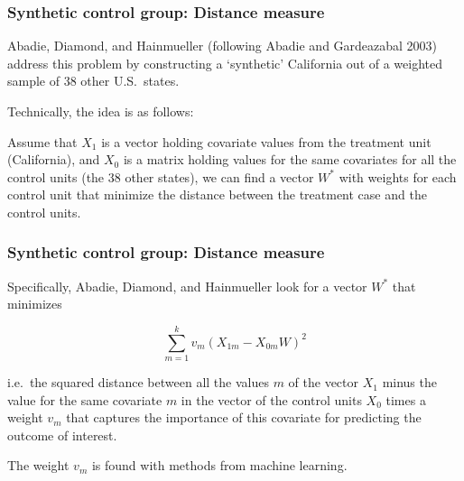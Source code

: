 \documentclass[12pt,english,dvipsnames,aspectratio=169,handout]{beamer}\usepackage[]{graphicx}\usepackage[]{xcolor}
\begin{document}
\begin{frame}
  \frametitle{Synthetic control group: Distance measure}
\footnotesize

Abadie, Diamond, and Hainmueller \citeyear{abadie_synthetic_2010} (following Abadie and Gardeazabal 2003) address this problem by constructing a `synthetic' California out of a weighted sample of 38 other U.S.\ states.

Technically, the idea is as follows:

Assume that $X_1$ is a vector holding covariate values from the treatment unit (California), and $X_0$ is a matrix holding values for the same covariates for all the control units (the 38 other states), we can find a vector $W^*$ with weights for each control unit that minimize the distance between the treatment case and the control units.

\vspace{10mm}

\end{frame}




\begin{frame}
  \frametitle{Synthetic control group: Distance measure}
\footnotesize

Specifically, Abadie, Diamond, and Hainmueller \citeyear{abadie_synthetic_2010} look for a vector $W^*$ that minimizes

\begin{equation*} 
\sum_{m=1}^{k} v_m(X_{1m}-X_{0m}W)^2
\end{equation*}

i.e.\ the squared distance between all the values $m$ of the vector $X_1$ minus the value for the same covariate $m$ in the vector of the control units $X_0$ times a weight $v_m$ that captures the importance of this covariate for predicting the outcome of interest. 

The weight $v_m$ is found with methods from machine learning.

\end{frame}
\end{document}
